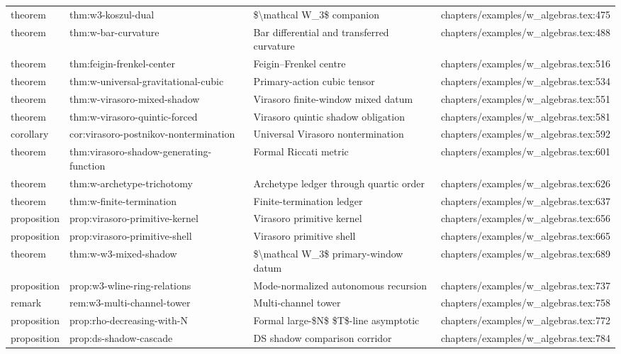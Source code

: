 \documentclass[11pt]{article}
\begin{document}
\begin{longtable}{L{0.10\textwidth}L{0.26\textwidth}L{0.42\textwidth}L{0.22\textwidth}}
theorem & thm:w3-koszul-dual & \$\textbackslash{}mathcal W\_3\$ companion & chapters/examples/w\_algebras.tex:475\\
theorem & thm:w-bar-curvature & Bar differential and transferred curvature & chapters/examples/w\_algebras.tex:488\\
theorem & thm:feigin-frenkel-center & Feigin--Frenkel centre & chapters/examples/w\_algebras.tex:516\\
theorem & thm:w-universal-gravitational-cubic & Primary-action cubic tensor & chapters/examples/w\_algebras.tex:534\\
theorem & thm:w-virasoro-mixed-shadow & Virasoro finite-window mixed datum & chapters/examples/w\_algebras.tex:551\\
theorem & thm:w-virasoro-quintic-forced & Virasoro quintic shadow obligation & chapters/examples/w\_algebras.tex:581\\
corollary & cor:virasoro-postnikov-nontermination & Universal Virasoro nontermination & chapters/examples/w\_algebras.tex:592\\
theorem & thm:virasoro-shadow-generating-function & Formal Riccati metric & chapters/examples/w\_algebras.tex:601\\
theorem & thm:w-archetype-trichotomy & Archetype led{}ger through quartic order & chapters/examples/w\_algebras.tex:626\\
theorem & thm:w-finite-termination & Finite-termination led{}ger & chapters/examples/w\_algebras.tex:637\\
proposition & prop:virasoro-primitive-kernel & Virasoro primitive kernel & chapters/examples/w\_algebras.tex:656\\
proposition & prop:virasoro-primitive-shell & Virasoro primitive shell & chapters/examples/w\_algebras.tex:665\\
theorem & thm:w-w3-mixed-shadow & \$\textbackslash{}mathcal W\_3\$ primary-window datum & chapters/examples/w\_algebras.tex:689\\
proposition & prop:w3-wline-ring-relations & Mode-normalized autonomous recursion & chapters/examples/w\_algebras.tex:737\\
remark & rem:w3-multi-channel-tower & Multi-channel tower & chapters/examples/w\_algebras.tex:758\\
proposition & prop:rho-decreasing-with-N & Formal large-\$N\$ \$T\$-line asymptotic & chapters/examples/w\_algebras.tex:772\\
proposition & prop:ds-shadow-cascade & DS shadow comparison corridor & chapters/examples/w\_algebras.tex:784\\

\end{longtable}
\end{document}
